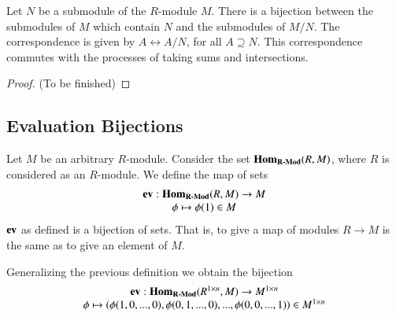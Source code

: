 \begin{namthm}\label{thmname:lattisomod}
    Let $N$ be a submodule of the $R$-module $M$. There is a bijection between the submodules of $M$ which contain $N$ and the submodules of $M/N$. The correspondence is given by $A\leftrightarrow A/N$, for all $A\supseteq N$. This correspondence commutes with the processes of taking sums and intersections.
\end{namthm}
\begin{proof}
    (To be finished)
\end{proof}



\subsection{\textsection Evaluation Bijections}

\begin{defn}
    Let $M$ be an arbitrary $R$-module. Consider the set $\mathbf{Hom}_{\normalfont\textbf{R-Mod}}(R,M)$, where $R$ is considered as an $R$-module. We define the map of sets \begin{equation}
        \begin{array}{c} \operatorname{\bf{ev}}:\mathbf{Hom}_{\normalfont\textbf{R-Mod}}(R,M) \rightarrow M \\ \phi\mapsto \phi(1) \in M \end{array}
    \end{equation}
    $\operatorname{\bf{ev}}$ as defined is a bijection of sets. That is, to give a map of modules $R\rightarrow M$ is the same as to give an element of $M$.
\end{defn}

\begin{defn}
    Generalizing the previous definition we obtain the bijection \begin{equation}
        \begin{array}{c} \operatorname{\bf{ev}}:\mathbf{Hom}_{\normalfont\textbf{R-Mod}}(R^{1\times n},M) \rightarrow M^{1\times n} \\ \phi\mapsto (\phi(1,0,...,0),\phi(0,1,...,0),...,\phi(0,0,...,1)) \in M^{1\times n} \end{array}
    \end{equation}
\end{defn}

